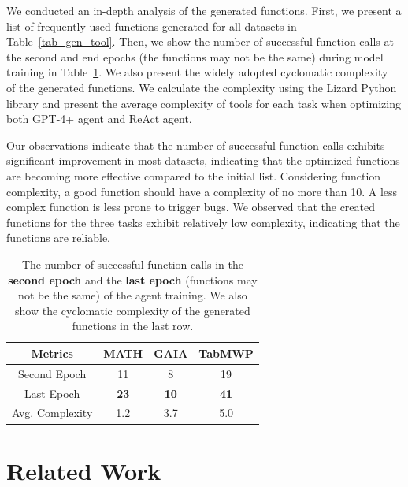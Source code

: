 \documentclass{article}
\theoremstyle{plain}
\theoremstyle{definition}
\theoremstyle{remark}
\begin{document}
We conducted an in-depth analysis of the generated functions. First, we present a list of frequently used functions generated for all datasets in Table~\ref{tab_gen_tool}. Then, we show the number of successful function calls at the second and end epochs (the functions may not be the same) during model training in Table~\ref{tab_tool_analysis}. We also present the widely adopted cyclomatic complexity~\cite{mccabe1994software} of the generated functions. We calculate the complexity using the Lizard Python library and present the average complexity of tools for each task when optimizing both GPT-4+ agent and ReAct agent.

Our observations indicate that the number of successful function calls exhibits significant improvement in most datasets, indicating that the optimized functions are becoming more effective compared to the initial list. Considering function complexity, a good function should have a complexity of no more than 10. A less complex function is less prone to trigger bugs. We observed that the created functions for the three tasks exhibit relatively low complexity, indicating that the functions are reliable.


\begin{table}[!t]
\setlength{\tabcolsep}{9pt} %
\renewcommand{\arraystretch}{0.85} 
\begin{tabular}{cccc}
\toprule[1.5pt]
Metrics                           & MATH        & GAIA        & TabMWP      \\ \hline
Second Epoch                & 11          & 8           & 19          \\
Last Epoch                  & \textbf{23} & \textbf{10} & \textbf{41} \\
Avg. Complexity &     1.2         &   3.7   &    5.0      \\ \bottomrule[1.5pt]
\end{tabular}
\vskip -0.09in
\caption{The number of successful function calls in the \textbf{second epoch} and the \textbf{last epoch} (functions may not be the same) of the agent training. We also show the cyclomatic complexity of the generated functions in the last row.
}
\label{tab_tool_analysis}
\vspace{-0.2in}
\end{table}
\section{Related Work}
\end{document}
